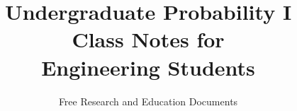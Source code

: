 \documentclass[12pt,openany]{book}
\begin{document}
\author{Free Research and Education Documents}
\title{
\Huge{Undergraduate Probability I}\\[5mm]
\Large{Class Notes for\\Engineering Students}}

\frontmatter
\maketitle



\tableofcontents

%

\mainmatter

















%

%

\printindex
\end{document}
